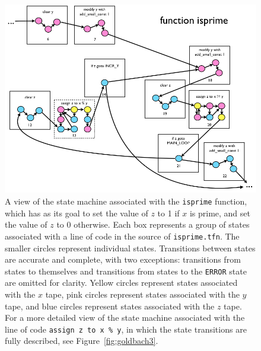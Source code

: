 \documentclass[11pt]{report}
\begin{document}
\begin{figure} 
\begin{center} 
\includegraphics[scale=0.4]{figs/goldbach2.png} 
\caption{A view of the state machine associated with the \texttt{isprime} function, which has as its goal to set the value of $z$ to 1 if $x$ is prime, and set the value of $z$ to 0 otherwise. Each box represents a group of states associated with a line of code in the source of \texttt{isprime.tfn}. The smaller circles represent individual states. Transitions between states are accurate and complete, with two exceptions: transitions from states to themselves and transitions from states to the \texttt{ERROR} state are omitted for clarity. Yellow circles represent states associated with the $x$ tape, pink circles represent states associated with the $y$ tape, and blue circles represent states associated with the $z$ tape. For a more detailed view of the state machine associated with the line of code \texttt{assign z to x \% y}, in which the state transitions are fully described, see Figure~\ref{fig:goldbach3}. \label{fig:goldbach2}}
\end{center} 
\end{figure}
\end{document}
